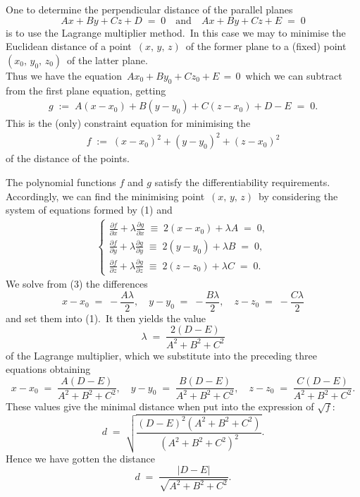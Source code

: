 \documentclass[12pt]{article}
\theoremstyle{definition}
\begin{document}
One  to determine the perpendicular distance of the parallel planes
$$Ax+By+Cz+D \;=\; 0 \quad \mbox{and} \quad Ax+By+Cz+E \;=\; 0$$
is to use the Lagrange multiplier method.\, In this case we may to minimise the Euclidean distance of a point 
\,$(x,\,y,\,z)$\, of the former plane to a (fixed) point \,$(x_0,\,y_0,\,z_0)$\, of the latter plane.\\

Thus we have the equation \,$Ax_0+By_0+Cz_0+E \,=\, 0$\, which we can subtract from the first plane equation, getting
\begin{align}
g \;:=\; A(x-x_0)+B(y-y_0)+C(z-x_0)+D-E \;=\; 0.
\end{align}
This is the (only) constraint equation for minimising the 
\begin{align}
f \;:=\; (x-x_0)^2+(y-y_0)^2+(z-x_0)^2
\end{align}
of the distance of the points.

The polynomial functions $f$ and $g$ satisfy the differentiability requirements.\, Accordingly, we can find the minimising point\, $(x,\,y,\,z)$\, by considering the system of equations formed by (1) and
\begin{align}
\begin{cases}
\frac{\partial f}{\partial x}+\lambda\frac{\partial g}{\partial x} 
\;\equiv\; 2(x-x_0)+\lambda A \;=\; 0,\\
\frac{\partial f}{\partial y}+\lambda\frac{\partial g}{\partial y} 
\;\equiv\; 2(y-y_0)+\lambda B \;=\; 0,\\
\frac{\partial f}{\partial z}+\lambda\frac{\partial g}{\partial z} 
\;\equiv\; 2(z-z_0)+\lambda C \;=\; 0.
\end{cases}
\end{align}
We solve from (3) the differences
$$x-x_0 \;=\; -\frac{A\lambda}{2}, \quad y-y_0 \;=\; -\frac{B\lambda}{2}, \quad z-z_0 \;=\; -\frac{C\lambda}{2}$$
and set them into (1).\, It then yields the value 
$$\lambda \;=\; \frac{2(D-E)}{A^2+B^2+C^2}$$
of the Lagrange multiplier, which we substitute into the preceding three equations obtaining
$$x-x_0 \;=\; \frac{A(D-E)}{A^2+B^2+C^2}, \quad y-y_0 \;=\; \frac{B(D-E)}{A^2+B^2+C^2}, 
\quad z-z_0 \;=\; \frac{C(D-E)}{A^2+B^2+C^2}.$$
These values give the minimal distance when put into the expression of $\sqrt{f}$:
$$d \;=\; \sqrt{\frac{(D-E)^2(A^2+B^2+C^2)}{(A^2+B^2+C^2)^2}}.$$
Hence we have gotten the distance 
$$d \;=\; \frac{|D-E|}{\sqrt{A^2+B^2+C^2}}.$$


\end{document}
